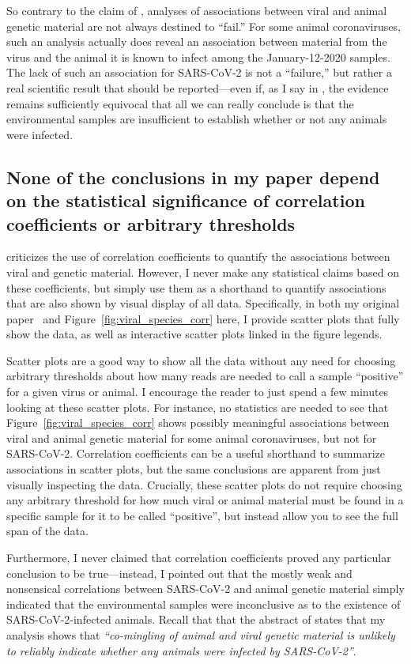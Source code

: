\documentclass[9pt,onecolumn,twoside]{gsajnl_modified}
\begin{document}
So contrary to the claim of \citet{debarre2024what}, analyses of associations between viral and animal genetic material are not always destined to ``fail.''
For some animal coronaviruses, such an analysis actually does reveal an association between material from the virus and the animal it is known to infect among the January-12-2020 samples.
The lack of such an association for SARS-CoV-2 is not a ``failure,'' but rather a real scientific result that should be reported---even if, as I say in \citet{bloom2023association}, the evidence remains sufficiently equivocal that all we can really conclude is that the environmental samples are insufficient to establish whether or not any animals were infected.

\subsection{None of the conclusions in my paper depend on the statistical significance of correlation coefficients or arbitrary thresholds}
\citet{debarre2024what} criticizes the use of correlation coefficients to quantify the associations between viral and genetic material.
However, I never make any statistical claims based on these coefficients, but simply use them as a shorthand to quantify associations that are also shown by visual display of all data.
Specifically, in both my original paper~\citep{bloom2023association} and Figure~\ref{fig:viral_species_corr} here, I provide scatter plots that fully show the data, as well as interactive scatter plots linked in the figure legends.

Scatter plots are a good way to show all the data without any need for choosing arbitrary thresholds about how many reads are needed to call a sample ``positive'' for a given virus or animal.
I encourage the reader to just spend a few minutes looking at these scatter plots.
For instance, no statistics are needed to see that Figure~\ref{fig:viral_species_corr} shows possibly meaningful associations between viral and animal genetic material for some animal coronaviruses, but not for SARS-CoV-2.
Correlation coefficients can be a useful shorthand to summarize associations in scatter plots, but the same conclusions are apparent from just visually inspecting the data.
Crucially, these scatter plots do not require choosing any arbitrary threshold for how much viral or animal material must be found in a specific sample for it to be called ``positive'', but instead allow you to see the full span of the data.

Furthermore, I never claimed that correlation coefficients proved any particular conclusion to be true---instead, I pointed out that the mostly weak and nonsensical correlations between SARS-CoV-2 and animal genetic material simply indicated that the environmental samples were inconclusive as to the existence of SARS-CoV-2-infected animals.
Recall that that the abstract of \citet{bloom2023association} states that my analysis shows that \textit{``co-mingling of animal and viral genetic material is unlikely to reliably indicate whether any animals were infected by SARS-CoV-2''}.
\end{document}
